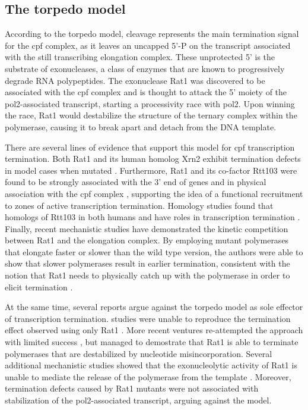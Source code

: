 \subsection{The torpedo model}



According to the torpedo model, cleavage represents the main termination signal for the \gls{cpf} complex, as it leaves an uncapped 5'-P on the transcript associated with the still transcribing elongation complex.
These unprotected 5' is the substrate of \FtoT{} exonucleases, a class of enzymes that are known to progressively degrade RNA polypeptides.
The \FtoT{} exonuclease Rat1 was discovered to be associated with the \gls{cpf} complex and is thought to attack the 5' moiety of the \gls{pol2}-associated transcript, starting a processivity race with \gls{pol2}.
Upon winning the race, Rat1 would destabilize the structure of the ternary complex within the polymerase, causing it to break apart and detach from the DNA template.

There are several lines of evidence that support this model for \gls{cpf} transcription termination.
Both Rat1 and its human homolog Xrn2 exhibit termination defects in model cases when mutated \citep{kim:2004:yeast, west:2004:human}.
Furthermore, Rat1 and its co-factor Rtt103 were found to be strongly associated with the 3' end of genes and in physical association with the \gls{cpf} complex \citep{kim:2004:yeast,luo:2006:role}, supporting the idea of a functional recruitment to zones of active transcription termination.
Homology studies found that homologs of Rtt103 in both humans and \cele{} have roles in transcription termination \citep{morales:2014:kub5hera, cui:2008:genes}.
Finally, recent mechanistic studies \invivo{} have demonstrated the kinetic competition between Rat1 and the elongation complex. By employing mutant polymerases that elongate faster or slower than the wild type version, the authors were able to show that slower polymerases result in earlier termination, consistent with the notion that Rat1 needs to physically catch up with the polymerase in order to elicit termination \citep{fong:2015:effects}.

At the same time, several reports argue against the torpedo model as sole effector of transcription termination.
\Invitro{} studies were unable to reproduce the termination effect observed \invivo{} using only Rat1  \citep{dengl:2009:torpedo}. More recent ventures re-attempted the \invitro{} approach with limited success  \citep{park:2015:unraveling}, but managed to demostrate that Rat1 is able to terminate polymerases that are destabilized by nucleotide misincorporation.
Several additional mechanistic studies showed that the exonucleolytic activity of Rat1 is unable to mediate the release of the polymerase from the template \citep{luo:2006:role, pearson:2013:dismantling}.
Moreover, termination defects caused by Rat1 mutants were not associated with stabilization of the \gls{pol2}-associated transcript, arguing against the model.


